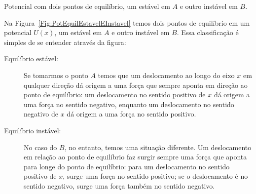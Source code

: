 \begin{marginfigure}[2cm]
\centering
{}
\caption{Potencial com dois pontos de equilíbrio, um estável em $A$ e outro instável em $B$. \label{Fig:PotEquilEstavelEInstavel}}
\end{marginfigure}

Na Figura~\ref{Fig:PotEquilEstavelEInstavel} temos dois pontos de equilíbrio em um potencial $U(x)$, um estável em $A$ e outro instável em $B$. Essa classificação é simples de se entender através da figura:
\begin{description}
    \item[Equilíbrio estável:] Se tomarmos o ponto $A$ temos que um deslocamento ao longo do eixo $x$ em qualquer direção dá origem a uma força que sempre aponta em direção ao ponto de equilíbrio: um deslocamento no sentido positivo de $x$ dá origem a uma força no sentido negativo, enquanto um deslocamento no sentido negativo de $x$ dá origem a uma força no sentido positivo.

    \item[Equilíbrio instável:] No caso do $B$, no entanto, temos uma situação diferente. Um deslocamento em relação ao ponto de equilíbrio faz surgir sempre uma força que aponta para longe do ponto de equilíbrio: para um deslocamento no sentido positivo de $x$, surge uma força no sentido positivo; se o deslocamento é no sentido negativo, surge uma força também no sentido negativo.
\end{description}

